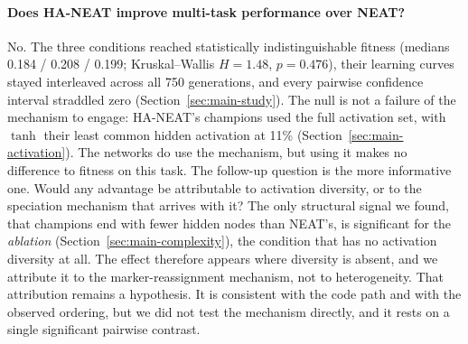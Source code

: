 \documentclass[12pt]{article}
\newcommand{\revClarity}[2]{#2}
\newcommand{\revTerm}[2]{#2}
\begin{document}
\paragraph{Does HA-NEAT improve multi-task performance over NEAT?}
No.
The three conditions reached statistically indistinguishable fitness (medians 0.184 / 0.208 / 0.199; Kruskal--Wallis $H = 1.48$, $p = 0.476$), their learning curves stayed interleaved across all 750 generations, and every pairwise confidence interval straddled zero (Section~\ref{sec:main-study}).
The null is not a failure of the mechanism to engage: HA-NEAT's champions \revTerm{T-11}{used the full activation set}, with $\tanh$ their least common hidden activation at 11\% (Section~\ref{sec:main-activation}).
The networks do use the mechanism, but using it makes no difference to fitness on this task.
\revClarity{L-03}{The follow-up question is the more informative one.} Would any advantage be attributable to activation diversity, or to the speciation mechanism that arrives with it?
The only structural signal we found, that champions end with fewer hidden nodes than NEAT's, is significant for the \emph{ablation} (Section~\ref{sec:main-complexity}), the condition that has no activation diversity at all.
The effect therefore appears where diversity is absent, and we attribute it to the marker-reassignment mechanism, not to heterogeneity.
That attribution remains a hypothesis. It is consistent with the code path and with the observed ordering, but we did not test the mechanism directly, and it rests on a single significant pairwise contrast.
\end{document}
